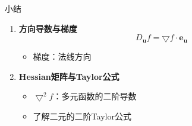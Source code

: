 \begin{frame}[<+->]{小结}
	\linespread{1.5}
	\begin{enumerate}
	  \item {\bf 方向导数与梯度}
	  $$D_{\bm{u}}f=\bigtriangledown f\cdot\bm{e_u}$$
	  \vspace{-2em}
	  \begin{itemize}
	    \item 梯度：法线方向
	  \end{itemize}
	  \item {\bf Hessian矩阵与Taylor公式}
	  \begin{itemize}
	    \item $\bigtriangledown^2 f$：多元函数的二阶导数
	    \item 了解二元的二阶Taylor公式
	  \end{itemize}
	\end{enumerate}
\end{frame}

 
% 
